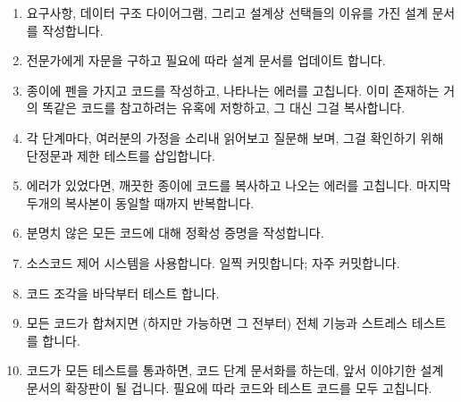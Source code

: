 \begin{enumerate}
\item	요구사항, 데이터 구조 다이어그램, 그리고 설계상 선택들의 이유를 가진
	설계 문서를 작성합니다.
\item	전문가에게 자문을 구하고 필요에 따라 설계 문서를 업데이트 합니다.
\item	종이에 펜을 가지고 코드를 작성하고, 나타나는 에러를 고칩니다.
	이미 존재하는 거의 똑같은 코드를 참고하려는 유혹에 저항하고, 그 대신
	그걸 복사합니다.
\item	각 단계마다, 여러분의 가정을 소리내 읽어보고 질문해 보며, 그걸 확인하기
	위해 단정문과 제한 테스트를 삽입합니다.
\item	에러가 있었다면, 깨끗한 종이에 코드를 복사하고 나오는 에러를 고칩니다.
	마지막 두개의 복사본이 동일할 때까지 반복합니다.
\item	분명치 않은 모든 코드에 대해 정확성 증명을 작성합니다.
\item	소스코드 제어 시스템을 사용합니다.
	일찍 커밋합니다; 자주 커밋합니다.
\item	코드 조각을 바닥부터 테스트 합니다.
\item	모든 코드가 합쳐지면 (하지만 가능하면 그 전부터) 전체 기능과 스트레스
	테스트를 합니다.
\item	코드가 모든 테스트를 통과하면, 코드 단계 문서화를 하는데, 앞서 이야기한
	설계 문서의 확장판이 될 겁니다.
	필요에 따라 코드와 테스트 코드를 모두 고칩니다.

\end{enumerate}

